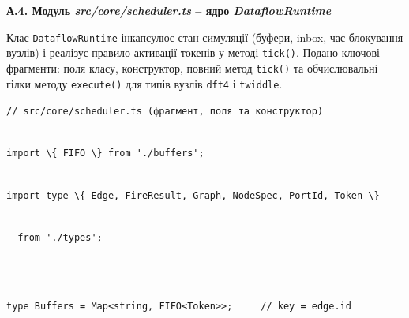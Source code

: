 \documentclass[
]{article}
\newcommand{\passthrough}[1]{#1}
\begin{document}
\textbf{А.4. Модуль \emph{src/core/scheduler.ts} -- ядро
\emph{DataflowRuntime}}

Клас \passthrough{\lstinline!DataflowRuntime!} інкапсулює стан симуляції
(буфери, inbox, час блокування вузлів) і реалізує правило активації
токенів у методі
\passthrough{\lstinline!tick!}\passthrough{\lstinline!()!}. Подано
ключові фрагменти: поля класу, конструктор, повний метод
\passthrough{\lstinline!tick!}\passthrough{\lstinline!()!} та
обчислювальні гілки методу
\passthrough{\lstinline!execute!}\passthrough{\lstinline!()!} для типів
вузлів \passthrough{\lstinline!dft!}\passthrough{\lstinline!4!} і
\passthrough{\lstinline!twiddle!}.

\passthrough{\lstinline!//!}\passthrough{\lstinline! !}\passthrough{\lstinline!src!}\passthrough{\lstinline!/core/!}\passthrough{\lstinline!scheduler.ts!}\passthrough{\lstinline! !}\passthrough{\lstinline!(!}\passthrough{\lstinline!фрагмент!}\passthrough{\lstinline!,!}\passthrough{\lstinline! !}\passthrough{\lstinline!поля!}\passthrough{\lstinline! !}\passthrough{\lstinline!та!}\passthrough{\lstinline! !}\passthrough{\lstinline!конструктор!}\passthrough{\lstinline!)!}\strut \\
\passthrough{\lstinline!import!}\passthrough{\lstinline! !}\passthrough{\lstinline!\{!}\passthrough{\lstinline! !}\passthrough{\lstinline!FIFO!}\passthrough{\lstinline! !}\passthrough{\lstinline!\}!}\passthrough{\lstinline! !}\passthrough{\lstinline!from!}\passthrough{\lstinline! !}\passthrough{\lstinline!'./buffers';!}\strut \\
\passthrough{\lstinline!import!}\passthrough{\lstinline! !}\passthrough{\lstinline!type!}\passthrough{\lstinline! !}\passthrough{\lstinline!\{!}\passthrough{\lstinline! !}\passthrough{\lstinline!Edge,!}\passthrough{\lstinline! !}\passthrough{\lstinline!FireResult!}\passthrough{\lstinline!,!}\passthrough{\lstinline! !}\passthrough{\lstinline!Graph,!}\passthrough{\lstinline! !}\passthrough{\lstinline!NodeSpec!}\passthrough{\lstinline!,!}\passthrough{\lstinline! !}\passthrough{\lstinline!PortId!}\passthrough{\lstinline!,!}\passthrough{\lstinline! !}\passthrough{\lstinline!Token!}\passthrough{\lstinline! !}\passthrough{\lstinline!\}!}\strut \\
\passthrough{\lstinline!  !}\passthrough{\lstinline!from!}\passthrough{\lstinline! !}\passthrough{\lstinline!'./types';!}\strut \\
\strut \\
\passthrough{\lstinline!type!}\passthrough{\lstinline! !}\passthrough{\lstinline!Buffers!}\passthrough{\lstinline! !}\passthrough{\lstinline!=!}\passthrough{\lstinline! !}\passthrough{\lstinline!Map<string,!}\passthrough{\lstinline! !}\passthrough{\lstinline!FIFO<Token>>;!}\passthrough{\lstinline!     !}\passthrough{\lstinline!//!}\passthrough{\lstinline! !}\passthrough{\lstinline!key!}\passthrough{\lstinline! !}\passthrough{\lstinline!=!}\passthrough{\lstinline! !}\passthrough{\lstinline!edge.id!}\strut \\
\end{document}
